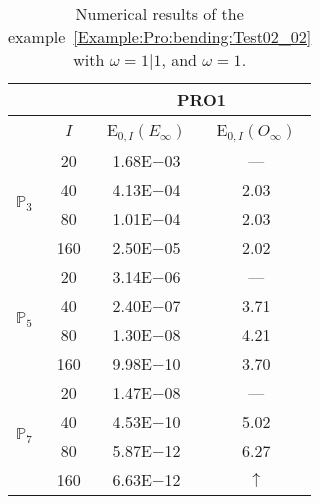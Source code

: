 \begin{table}[H]
\caption{Numerical results of the example~\ref{Example:Pro:bending:Test02_02} with $\omega=1|1$, and $\omega=1$.}
\setlength{\tabcolsep}{5pt}
\centering
\begin{tabular}{@{}l c c c@{}}
\toprule
 &  & \multicolumn{2}{c}{PRO1}\\
\midrule
 & $I$ & E$_{0,I}(E_{\infty})$ & E$_{0,I}(O_{\infty})$\\
\midrule
\multirow{4}{*}{$\mathbb{P}_{3}$} & 20 & 1.68E$-$03 & ---\\
 & 40 & 4.13E$-$04 & 2.03\\
 & 80 & 1.01E$-$04 & 2.03\\
 & 160 & 2.50E$-$05 & 2.02\\
\midrule
\multirow{4}{*}{$\mathbb{P}_{5}$} & 20 & 3.14E$-$06 & ---\\
 & 40 & 2.40E$-$07 & 3.71\\
 & 80 & 1.30E$-$08 & 4.21\\
 & 160 & 9.98E$-$10 & 3.70\\
\midrule
\multirow{4}{*}{$\mathbb{P}_{7}$} & 20 & 1.47E$-$08 & ---\\
 & 40 & 4.53E$-$10 & 5.02\\
 & 80 & 5.87E$-$12 & 6.27\\
 & 160 & 6.63E$-$12 & $\uparrow$\\
\bottomrule
\end{tabular}
\label{Table:PRO:test_02_02_test5}
\end{table}
